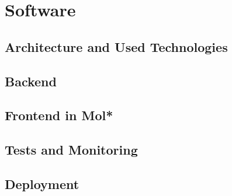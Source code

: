 \chapter{Software}
\label{chap:software}



\section{Architecture and Used Technologies}
\label{sec:architecture-technologies}


\section{Backend}
\label{sec:backend}


\section{Frontend in Mol*}
\label{sec:frontend-molstar}



\section{Tests and Monitoring}
\label{sec:tests-monitoring}



\section{Deployment}
\label{sec:deployment}

